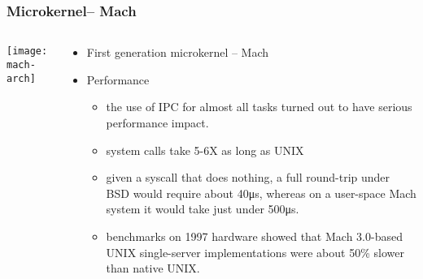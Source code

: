\begin{frame}[plain]
	\frametitle{Microkernel-- Mach}
	
	
	\begin{columns}
		
		\begin{column}{.4\textwidth}
			\centering
			\texttt{[image: mach-arch]}
		\end{column}
		
		\begin{column}{.6\textwidth}
			
			\begin{itemize}
				\item First generation microkernel -- Mach 
				\item Performance
				\begin{itemize}
					\item the use of IPC for almost all tasks turned out to have serious performance impact. 
					\item system calls take 5-6X as long as UNIX
					\item  given a syscall that does nothing, a full round-trip under BSD would require about 40μs, whereas on a user-space Mach system it would take just under 500μs. 

					\item benchmarks on 1997 hardware showed that Mach 3.0-based UNIX single-server implementations were about 50\% slower than native UNIX.
				\end{itemize}		
			\end{itemize}	
			
		\end{column}
		
		
	\end{columns}
	
\end{frame}







